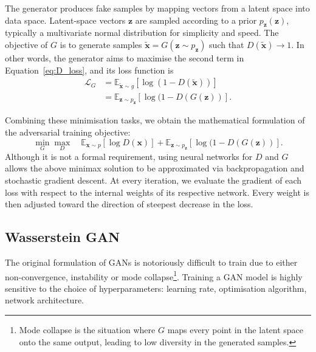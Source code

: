 The generator produces fake samples by mapping vectors from a latent space into
data space. Latent-space vectors $\bm{z}$ are sampled according to a prior
$p_{\bm{z}}(\bm{z})$, typically a multivariate normal distribution for
simplicity and speed. The objective of $G$ is to generate samples
$\tilde{\bm{x}} = G(\bm{z} \sim p_{\bm{z}})$ such that
$D(\tilde{\bm{x}}) \rightarrow 1$. In other words, the generator aims to
maximise the second term in Equation~\ref{eq:D_loss}, and its loss function is
\begin{align}\label{eq:GAN_gen}
    \mathcal{L}_G & =
    \mathbb{E}_{\tilde{\bm{x}} \sim g} [ \log( 1 - D(\tilde{\bm{x}}) )]\nonumber        \\
                  & = \mathbb{E}_{\bm{z} \sim p_{\bm{z}}} [ \log( 1 - D(G(\bm{z}) )].
\end{align}

Combining these minimisation tasks, we obtain the mathematical formulation of
the adversarial training objective:
\begin{equation}\label{eq:GAN}
    \min_G \max_D \quad
    \mathbb{E}_{\bm{x} \sim p} [ \log D(\bm{x}) ] +
    \mathbb{E}_{\bm{z} \sim p_{\bm{z}}} [ \log( 1 - D(G(\bm{z}) )].
\end{equation}
Although it is not a formal requirement, using neural networks for $D$ and $G$
allows the above minimax solution to be approximated via backpropagation and
stochastic gradient descent. At every iteration, we evaluate the gradient of
each loss with respect to the internal weights of its respective network. Every
weight is then adjusted toward the direction of steepest decrease in the loss.



\subsection{Wasserstein GAN}
The original formulation of GANs is notoriously difficult to train due to either
non-convergence, instability or mode collapse\footnote{Mode collapse is the
situation where $G$ maps every point in the latent space onto the same output,
leading to low diversity in the generated samples.}. Training a GAN model is
highly sensitive to the choice of hyperparameters: learning rate, optimisation
algorithm, network architecture.


